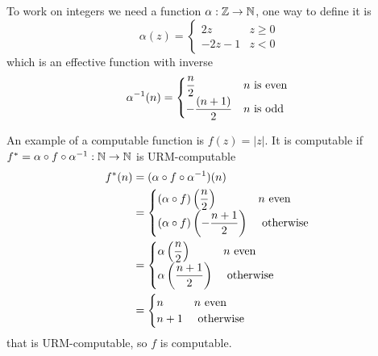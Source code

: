 \begin{example}
  To work on integers we need a function $ \alpha: \mathbb{Z} \rightarrow \mathbb{N} $, one way to define it is
  \begin{equation*}
    \alpha(z) = \begin{cases}
      2z    & z \geq 0 \\
      -2z-1 & z < 0
    \end{cases} 
  \end{equation*}
which is an effective function with inverse
\begin{equation*}
  \alpha^{-1}(n) = \begin{cases}
    \dfrac{n}{2}    & n $ is even $ \\
    -\dfrac{(n+1)}{2} & n $ is odd $
  \end{cases}
\end{equation*}

An example of a computable function is $f (z) =  |z| $. 
It is computable if $ f^*=\alpha\circ f\circ \alpha^{-1} : \mathbb{N} \rightarrow \mathbb{N} $ is URM-computable
\begin{align*}
  f^*(n) &= (\alpha\circ f\circ \alpha^{-1})(n)\\ 
         &=  
\begin{cases}
  (\alpha\circ f)\left(\dfrac{n}{2}\right) & n $ even $ \\
  (\alpha\circ f)\left(-\dfrac{n+1}{2}\right) & $ otherwise $
\end{cases}\\
&=
\begin{cases}
  \alpha\left(\dfrac{n}{2}\right) & n $ even $\\
  \alpha\left(\dfrac{n+1}{2}\right) & $ otherwise $
\end{cases}\\
&= \begin{cases}
  n   & n $ even $ \\
  n+1 & $ otherwise $
\end{cases} 
\end{align*}
that is URM-computable, so $f$ is computable.
\end{example}

